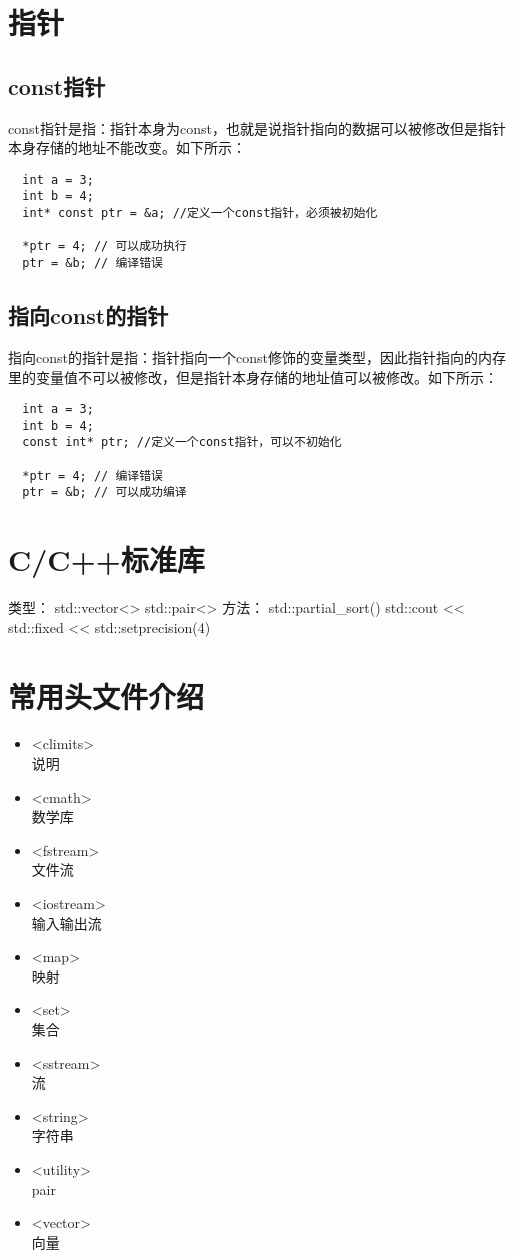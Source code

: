 \section{指针}
\subsection{const指针}\label{c/ptr/constptr}
const指针是指：指针本身为const，也就是说指针指向的数据可以被修改但是指针本身存储的地址不能改变。如下所示：
\begin{verbatim}
  int a = 3;
  int b = 4;
  int* const ptr = &a; //定义一个const指针，必须被初始化

  *ptr = 4; // 可以成功执行
  ptr = &b; // 编译错误
\end{verbatim}
\subsection{指向const的指针}\label{c/ptr/ptr2const}
指向const的指针是指：指针指向一个const修饰的变量类型，因此指针指向的内存里的变量值不可以被修改，但是指针本身存储的地址值可以被修改。如下所示：
\begin{verbatim}
  int a = 3;
  int b = 4;
  const int* ptr; //定义一个const指针，可以不初始化

  *ptr = 4; // 编译错误
  ptr = &b; // 可以成功编译
\end{verbatim}

\section{C/C++标准库}
类型：
std::vector<>
std::pair<>
方法：
std::partial\_sort()
std::cout << std::fixed << std::setprecision(4)

\section{常用头文件介绍}
\begin{itemize}
\item <climits> \\
  说明
\item <cmath> \\
  数学库
\item <fstream> \\
  文件流
\item <iostream> \\
  输入输出流
\item <map> \\
  映射
\item <set> \\
  集合
\item <sstream> \\
  流
\item <string> \\
  字符串
\item <utility> \\
  pair
\item <vector> \\
  向量
\end{itemize}
